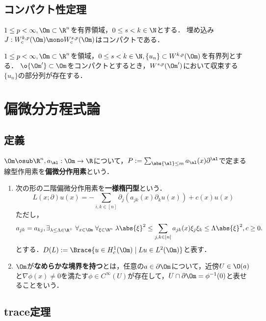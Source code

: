 \documentclass[uplatex, dvipdfmx]{jsreport}
\begin{document}
\subsection{コンパクト性定理}

\begin{theorem}[Rellich]
    $1\le p<\infty,\Om\subset\R^n$を有界領域，$0\le s<k\in\N$とする．
    埋め込み$J:W^{k,p}_c(\Om)\mono W^{s,p}_c(\Om)$はコンパクトである．
\end{theorem}

\begin{corollary}
    $1\le p<\infty,\Om\subset\R^n$を領域，$0\le s<k\in\N,\{u_n\}\subset W^{k,p}(\Om)$を有界列とする．
    $\o{\Om'}\subset\Om$をコンパクトとするとき，$W^{s,p}(\Om')$において収束する$\{u_n\}$の部分列が存在する．
\end{corollary}

\section{偏微分方程式論}

\subsection{定義}

\begin{definition}
    $\Om\osub\R^n,a_\al:\Om\to\R$について，$P:=\sum_{\abs{\al}\le m}a_\al(x)\partial^\al$で定まる線型作用素を\textbf{偏微分作用素}という．
    \begin{enumerate}
        \item 次の形の二階偏微分作用素を\textbf{一様楕円型}という．
        \[L(x;\partial)u(x)=-\sum_{i,k\in[n]}\partial_j(a_{jk}(x)\partial_ku(x))+c(x)u(x)\]
        ただし，
        \[a_{jk}=a_{kj},\exists_{\lambda\le\Lambda\in\R^+}\;\forall_{x\in\Om}\;\forall_{\xi\in\R^n}\;\lambda\abs{\xi}^2\le\sum_{j,k\in[n]}a_{jk}(x)\xi_j\xi_k\le\Lambda\abs{\xi}^2,c\ge0.\]
        とする．$D(L):=\Brace{u\in H^1_c(\Om)\mid Lu\in L^2(\Om)}$と表す．
        \item $\Om$が\textbf{なめらかな境界を持つ}とは，任意の$a\in\partial\Om$について，近傍$U\in\O(a)$と$\nabla\phi(x)\ne0$を満たす$\phi\in C^\infty(U)$が存在して，$U\cap\partial\Om=\phi^{-1}(0)$と表せることをいう．
    \end{enumerate}
\end{definition}

\subsection{trace定理}
\end{document}
